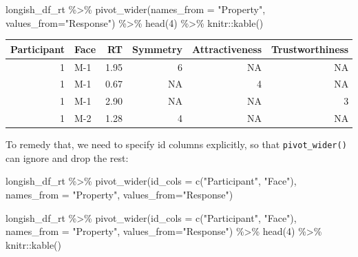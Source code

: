 \documentclass[
]{book}
\newenvironment{Shaded}{\begin{snugshade}}{\end{snugshade}}
\newcommand{\AttributeTok}[1]{\textcolor[rgb]{0.77,0.63,0.00}{#1}}
\newcommand{\DecValTok}[1]{\textcolor[rgb]{0.00,0.00,0.81}{#1}}
\newcommand{\FunctionTok}[1]{\textcolor[rgb]{0.00,0.00,0.00}{#1}}
\newcommand{\NormalTok}[1]{#1}
\newcommand{\SpecialCharTok}[1]{\textcolor[rgb]{0.00,0.00,0.00}{#1}}
\newcommand{\StringTok}[1]{\textcolor[rgb]{0.31,0.60,0.02}{#1}}
\begin{document}
\begin{Shaded}
\begin{Highlighting}[]
\NormalTok{longish\_df\_rt }\SpecialCharTok{\%\textgreater{}\%}
  \FunctionTok{pivot\_wider}\NormalTok{(}\AttributeTok{names\_from =} \StringTok{"Property"}\NormalTok{, }\AttributeTok{values\_from=}\StringTok{"Response"}\NormalTok{) }\SpecialCharTok{\%\textgreater{}\%}
  \FunctionTok{head}\NormalTok{(}\DecValTok{4}\NormalTok{) }\SpecialCharTok{\%\textgreater{}\%}
\NormalTok{  knitr}\SpecialCharTok{::}\FunctionTok{kable}\NormalTok{()}
\end{Highlighting}
\end{Shaded}

\begin{tabular}{r|l|r|r|r|r}
\hline
Participant & Face & RT & Symmetry & Attractiveness & Trustworthiness\\
\hline
1 & M-1 & 1.95 & 6 & NA & NA\\
\hline
1 & M-1 & 0.67 & NA & 4 & NA\\
\hline
1 & M-1 & 2.90 & NA & NA & 3\\
\hline
1 & M-2 & 1.28 & 4 & NA & NA\\
\hline
\end{tabular}

To remedy that, we need to specify id columns explicitly, so that \texttt{pivot\_wider()} can ignore and drop the rest:

\begin{Shaded}
\begin{Highlighting}[]
\NormalTok{longish\_df\_rt }\SpecialCharTok{\%\textgreater{}\%}
  \FunctionTok{pivot\_wider}\NormalTok{(}\AttributeTok{id\_cols =} \FunctionTok{c}\NormalTok{(}\StringTok{"Participant"}\NormalTok{, }\StringTok{"Face"}\NormalTok{), }\AttributeTok{names\_from =} \StringTok{"Property"}\NormalTok{, }\AttributeTok{values\_from=}\StringTok{"Response"}\NormalTok{)}
\end{Highlighting}
\end{Shaded}

\begin{Shaded}
\begin{Highlighting}[]
\NormalTok{longish\_df\_rt }\SpecialCharTok{\%\textgreater{}\%}
  \FunctionTok{pivot\_wider}\NormalTok{(}\AttributeTok{id\_cols =} \FunctionTok{c}\NormalTok{(}\StringTok{"Participant"}\NormalTok{, }\StringTok{"Face"}\NormalTok{), }\AttributeTok{names\_from =} \StringTok{"Property"}\NormalTok{, }\AttributeTok{values\_from=}\StringTok{"Response"}\NormalTok{) }\SpecialCharTok{\%\textgreater{}\%}
  \FunctionTok{head}\NormalTok{(}\DecValTok{4}\NormalTok{) }\SpecialCharTok{\%\textgreater{}\%}
\NormalTok{  knitr}\SpecialCharTok{::}\FunctionTok{kable}\NormalTok{()}
\end{Highlighting}
\end{Shaded}
\end{document}
